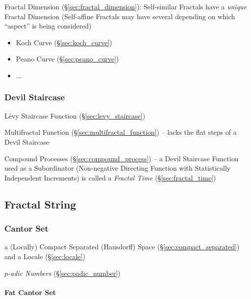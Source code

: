 Fractal Dimension (\S\ref{sec:fractal_dimension}): Self-similar Fractals have a
\emph{unique} Fractal Dimension (Self-affine Fractals may have several depending
on which ``aspect'' is being considered)

\begin{itemize}
  \item Koch Curve (\S\ref{sec:koch_curve})
  \item Peano Curve (\S\ref{sec:peano_curve})
  \item ...
\end{itemize}



\subsubsection{Devil Staircase}\label{sec:devil_staircase}

L\'evy Staircase Function (\S\ref{sec:levy_staircase})

\fist Multifractal Function (\S\ref{sec:multifractal_function}) -- lacks the
flat steps of a Devil Staircase

Compound Processes (\S\ref{sec:compound_process}) -- a Devil Staircase Function
used as a Subordinator (Non-negative Directing Function with Statistically
Independent Increments) is called a \emph{Fractal Time}
(\S\ref{sec:fractal_time})



\subsection{Fractal String}\label{sec:fractal_string}

\subsubsection{Cantor Set}\label{sec:cantor_set}

a (Locally) Compact Separated (Hausdorff) Space (\S\ref{sec:compact_separated})
and a Locale (\S\ref{sec:locale})

\emph{$p$-adic Numbers} (\S\ref{sec:padic_number})



\paragraph{Fat Cantor Set}\label{sec:fat_cantor_set}\hfill

